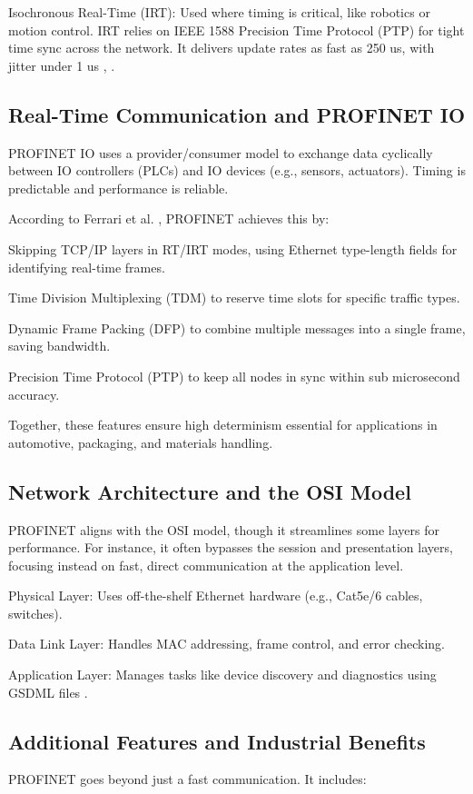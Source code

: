 \documentclass[conference]{IEEEtran}
\begin{document}
Isochronous Real-Time (IRT): Used where timing is critical, like robotics or motion control. IRT relies on IEEE 1588 Precision Time Protocol (PTP) for tight time sync across the network. It delivers update rates as fast as 250 us, with jitter under 1 us \cite{ferrari2004profinet}, \cite{schumacher2008profinet}.

\subsection{Real-Time Communication and PROFINET IO} 
PROFINET IO uses a provider/consumer model to exchange data cyclically between IO controllers (PLCs) and IO devices (e.g., sensors, actuators). Timing is predictable and performance is reliable.

According to Ferrari et al. \cite{ferrari2004profinet}, PROFINET achieves this by:

Skipping TCP/IP layers in RT/IRT modes, using Ethernet type-length fields for identifying real-time frames.

Time Division Multiplexing (TDM) to reserve time slots for specific traffic types.

Dynamic Frame Packing (DFP) to combine multiple messages into a single frame, saving bandwidth.

Precision Time Protocol (PTP) to keep all nodes in sync within sub microsecond accuracy.

Together, these features ensure high determinism essential for applications in automotive, packaging, and materials handling.

\subsection{Network Architecture and the OSI Model} 
PROFINET aligns with the OSI model, though it streamlines some layers for performance. For instance, it often bypasses the session and presentation layers, focusing instead on fast, direct communication at the application level.

Physical Layer: Uses off-the-shelf Ethernet hardware (e.g., Cat5e/6 cables, switches).

Data Link Layer: Handles MAC addressing, frame control, and error checking.

Application Layer: Manages tasks like device discovery and diagnostics using GSDML files \cite{patzke1998fieldbus}.

\subsection{Additional Features and Industrial Benefits}
PROFINET goes beyond just a fast communication. It includes:
\end{document}
